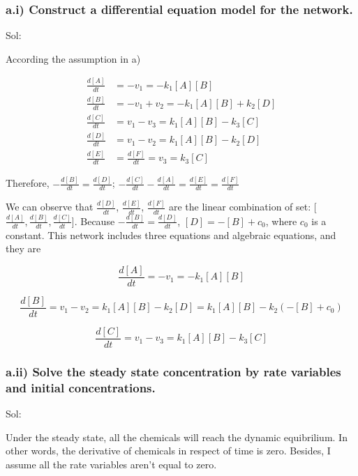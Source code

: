 \documentclass[11pt]{article}
\begin{document}
    \hypertarget{a.i-construct-a-differential-equation-model-for-the-network.}{%
\subsubsection{a.i) Construct a differential equation model for the
network.}\label{a.i-construct-a-differential-equation-model-for-the-network.}}

Sol:

According the assumption in a)

\[\begin{align}
\frac{d[A]}{dt}&=-v_{1}=-k_{1}[A][B] \\
\frac{d[B]}{dt}&=-v_{1}+v_{2}=-k_{1}[A][B]+k_{2}[D] \\
\frac{d[C]}{dt}&=v_{1}-v_{3}=k_{1}[A][B]-k_{3}[C] \\
\frac{d[D]}{dt}&=v_{1}-v_{2}=k_{1}[A][B]-k_{2}[D] \\
\frac{d[E]}{dt}&=\frac{d[F]}{dt}=v_{3}=k_{3}[C] 
\end{align}\]

    Therefore, \(-\frac{d[B]}{dt}=\frac{d[D]}{dt}\);
\(-\frac{d[C]}{dt}-\frac{d[A]}{dt}=\frac{d[E]}{dt}=\frac{d[F]}{dt}\)

    We can observe that \(\frac{d[D]}{dt}\), \(\frac{d[E]}{dt}\),
\(\frac{d[F]}{dt}\) are the linear combination of set:
{[}\(\frac{d[A]}{dt},\frac{d[B]}{dt}, \frac{d[C]}{dt}\){]}. Because
\(-\frac{d[B]}{dt}=\frac{d[D]}{dt}\), \([D] = -[B]+c_{0}\), where
\(c_{0}\) is a constant. This network includes three equations and
algebraic equations, and they are

    \[\frac{d[A]}{dt}=-v_{1}=-k_{1}[A][B]\]

\[\frac{d[B]}{dt}=v_{1}-v_{2}=k_{1}[A][B]-k_{2}[D]=k_{1}[A][B]-k_{2}(-[B]+c_{0})\]

\[\frac{d[C]}{dt}=v_{1}-v_{3}=k_{1}[A][B]-k_{3}[C]\]

    \hypertarget{a.ii-solve-the-steady-state-concentration-by-rate-variables-and-initial-concentrations.}{%
\subsubsection{a.ii) Solve the steady state concentration by rate
variables and initial
concentrations.}\label{a.ii-solve-the-steady-state-concentration-by-rate-variables-and-initial-concentrations.}}

    Sol:

Under the steady state, all the chemicals will reach the dynamic
equibrilium. In other words, the derivative of chemicals in respect of
time is zero. Besides, I assume all the rate variables aren't equal to
zero.
\end{document}
